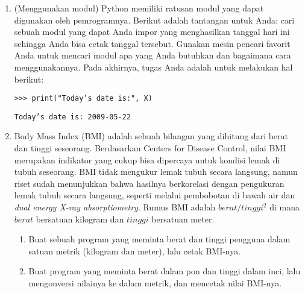 \documentclass[14pt]{extarticle}
\begin{document}
\begin{enumerate}
	\item (Menggunakan modul) Python memiliki ratusan modul yang dapat digunakan oleh pemrogramnya. Berikut adalah tantangan untuk Anda: cari sebuah modul yang dapat Anda impor yang menghasilkan tanggal hari ini sehingga Anda bisa cetak tanggal tersebut. Gunakan mesin pencari favorit Anda untuk mencari modul apa yang Anda butuhkan dan bagaimana cara menggunakannya. Pada akhirnya, tugas Anda adalah untuk melakukan hal berikut:
	
	\texttt{>>> print("Today's date is:", X)}
	
	\texttt{Today's date is: 2009-05-22}
	
	\item Body Mass Index (BMI) adalah sebuah bilangan yang dihitung dari berat dan tinggi seseorang. Berdasarkan Centers for Disease Control, nilai BMI merupakan indikator yang cukup bisa dipercaya untuk kondisi lemak di tubuh seseorang. BMI tidak mengukur lemak tubuh secara langsung, namun riset sudah menunjukkan bahwa hasilnya berkorelasi dengan pengukuran lemak tubuh secara langsung, seperti melalui pembobotan di bawah air dan \emph{dual energy X-ray absorptiometry}. Rumus BMI adalah $berat/tinggi^2$ di mana $berat$ bersatuan kilogram dan $tinggi$ bersatuan meter.
	\begin{enumerate}
		\item Buat sebuah program yang meminta berat dan tinggi pengguna dalam satuan metrik (kilogram dan meter), lalu cetak BMI-nya.
		\item Buat program yang meminta berat dalam pon dan tinggi dalam inci, lalu mengonversi nilainya ke dalam metrik, dan mencetak nilai BMI-nya.
	\end{enumerate}

\end{enumerate}
\end{document}
